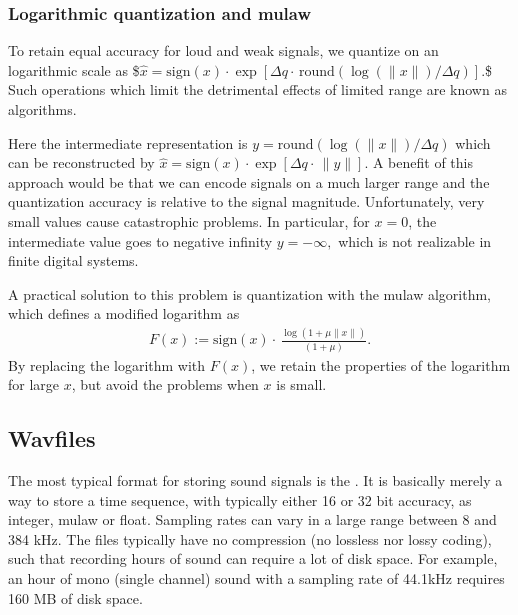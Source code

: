 \documentclass[letterpaper,10pt,english]{jupyterBook}
\begin{document}
\subsubsection{Logarithmic quantization and mu\sphinxhyphen{}law}
\label{\detokenize{Representations/Waveform:logarithmic-quantization-and-mu-law}}
\sphinxAtStartPar
To retain equal accuracy for loud and weak signals, we  quantize
on an logarithmic scale as
\$\( \hat x = {\mathrm{sign}}(x)\cdot\exp\left[ \Delta
q\cdot\,{\mathrm{round}} \left(\log\left(\|x\|\right)/\Delta
q\right) \right]. \)\$
Such operations which limit the detrimental effects of limited range are
known as 
algorithms.

\sphinxAtStartPar
Here the intermediate representation is  \( y = {\mathrm{round}}
\left(\log\left(\|x\|\right)/\Delta q\right) \) which can be
reconstructed by  \( \hat x = {\mathrm{sign}}(x)\cdot\exp\left[
\Delta q\cdot\,\|y\| \right]. \) A benefit of this approach would
be that we can encode signals on a much larger range and the
quantization accuracy is relative to the signal magnitude.
Unfortunately, very small values cause catastrophic problems. In
particular, for \(x=0\), the intermediate value goes to negative infinity
\( y=-\infty, \) which is not realizable in finite digital systems.

\sphinxAtStartPar
A practical solution to this problem is quantization with the mu\sphinxhyphen{}law
algorithm, which defines a modified logarithm as
\begin{equation*}
\begin{split}
F(x):={\mathrm{sign}}(x)\cdot\,\frac{\log\left(1+\mu\|x\|\right)}{\left(1+\mu\right)}.
\end{split}
\end{equation*}
\sphinxAtStartPar
By replacing the logarithm with \(F(x)\), we retain the properties of the
logarithm for large \(x\), but avoid the problems when \(x\) is small.

\sphinxAtStartPar
{}


\subsection{Wav\sphinxhyphen{}files}
\label{\detokenize{Representations/Waveform:wav-files}}
\sphinxAtStartPar
The most typical format for storing sound signals is the . It is basically merely a way
to store a time sequence, with typically either 16 or 32 bit accuracy,
as integer, mu\sphinxhyphen{}law or float. Sampling rates can vary in a large range
between 8 and 384 kHz. The files typically have no compression (no
lossless nor lossy coding), such that recording hours of sound can
require a lot of disk space. For example, an hour of mono (single
channel) sound with a sampling rate of 44.1kHz requires 160 MB of disk
space.
\end{document}
